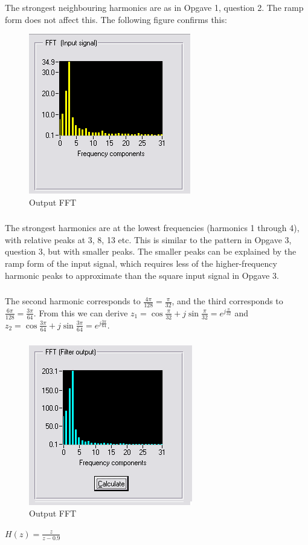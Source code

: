 \documentclass[a4paper, 12pt, titlepage]{article}
\begin{document}
\subsubsection{}
The strongest neighbouring harmonics are as in Opgave 1, question 2. The ramp
form does not affect this. The following figure confirms this:
\begin{figure}[H]
\includegraphics[scale=0.7]{4FFTinput.png}
\caption{Output FFT}
\end{figure}
\subsubsection{}
The strongest harmonics are at the lowest frequencies (harmonics 1 through 4),
with relative peaks at 3, 8, 13 etc. This is similar to the pattern in Opgave 3,
question 3, but with smaller peaks. The smaller peaks can be explained by the
ramp form of the input signal, which requires less of the higher-frequency
harmonic peaks to approximate than the square input signal in Opgave 3.
\subsubsection{}
The second harmonic corresponds to $\frac{4\pi}{128} = \frac{\pi}{32}$, and the
third corresponds to $\frac{6\pi}{128}=\frac{3\pi}{64}$. From this we can derive
$z_1 = \cos{\frac{\pi}{32}}+j \sin{\frac{\pi}{32}}=e^{j\frac{\pi}{32}}$ and 
$z_2 = \cos{\frac{3\pi}{64}}+j \sin{\frac{3\pi}{64}}=e^{j\frac{3\pi}{64}}$.
\subsubsection{}
\begin{figure}[H]
\includegraphics[scale=0.7]{4FFToutput.png}
\caption{Output FFT}
\end{figure}
$H(z)=\frac{z}{z-0.9}$
\end{document}
